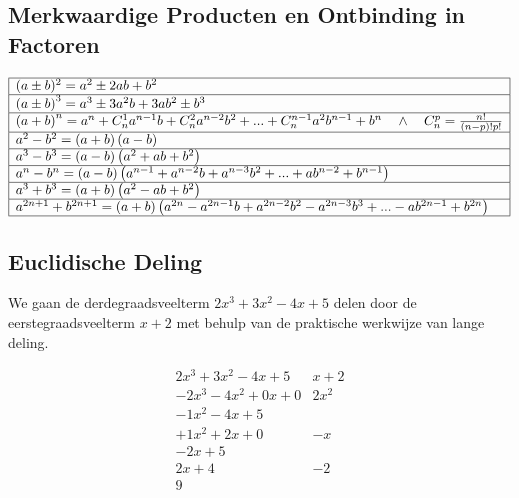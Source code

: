 \documentclass[a5paper]{article}
\begin{document}
\subsection{Merkwaardige Producten en Ontbinding in Factoren}
\[
\begin{array}{|l|l|}
\hline
(a\pm b)^2 = a^2 \pm 2ab + b^2 \\ 
\hline
{\left( {a \pm b} \right)^3} = {a^3} \pm 3{a^2}b + 3a{b^2} \pm {b^3} \\
\hline
{\left( {a + b} \right)^n} = {a^n} + C_n^1{a^{n - 1}}b + C_n^2{a^{n - 2}}{b^2} + ... + C_n^{n - 1}{a^2}{b^{n - 1}} + {b^n}\quad  \wedge \quad C_n^p = \frac{{n!}}{{\left( {n - p} \right)!p!}} \\
\hline
{a^2} - {b^2} = \left( {a + b} \right)\left( {a - b} \right) \\
\hline
{a^3} - {b^3} = \left( {a - b} \right)\left( {{a^2} + ab + {b^2}} \right) \\
\hline
{a^n} - {b^n} = \left( {a - b} \right)\left( {{a^{n - 1}} + {a^{n - 2}}b + {a^{n - 3}}{b^2} + ... + a{b^{n - 2}} + {b^{n - 1}}} \right) \\
\hline
{a^3} + {b^3} = \left( {a + b} \right)\left( {{a^2} - ab + {b^2}} \right) \\
\hline
{a^{2n + 1}} + {b^{2n + 1}} = \left( {a + b} \right)\left( {{a^{2n}} - {a^{2n - 1}}b + {a^{2n - 2}}{b^2} - {a^{2n - 3}}{b^3} + ... - a{b^{2n - 1}} + {b^{2n}}} \right) \\
\hline
\end{array}
\]

\newpage

\subsection{Euclidische Deling}
We gaan de derdegraadsveelterm $2x^3 + 3x^2 - 4x + 5$ delen door de eerstegraadsveelterm $x + 2$ met behulp van de praktische werkwijze van lange deling.

\[
\begin{array}{r|l}
   2x^3 + 3x^2 - 4x + 5 & x + 2 \\
  \hline
  -2x^3 - 4x^2 + 0x + 0 & 2x^2 \\
  \hline
        - 1x^2 - 4x + 5 & \\
        + 1x^2 + 2x + 0 & -x \\
  \hline
                -2x + 5 & \\
                 2x + 4 & -2 \\
  \hline
  9 & 
\end{array}
\]
\end{document}
